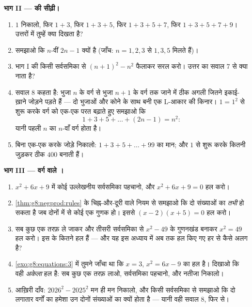 \begin{problem}[{सप्ताहांत समस्या --- $(a+b)^2$, $(a-b)^2$,
$(a+b)(a-b)$, और योग $1 + 3 + 5 + \dots + (2n-1) = n^2$}]
\medskip
\noindent\textbf{भाग II ---  की सीढ़ी।}
\begin{enumerate}[resume]
  \item $1$ निकालो, फिर $1 + 3$, फिर $1 + 3 + 5$, फिर
        $1 + 3 + 5 + 7$, फिर $1 + 3 + 5 + 7 + 9$। उत्तरों में
        तुम्हें क्या दिखता है?
  \item समझाओ कि $n$-वीं  $2n - 1$ क्यों है (जाँच:
        $n = 1, 2, 3$ से $1, 3, 5$ मिलते हैं)।
  \item भाग I की किसी सर्वसमिका से $(n + 1)^2 - n^2$ फैलाकर सरल
        करो। उत्तर का सवाल 7 से क्या नाता है?
  \item सवाल 8 कहता है: भुजा $n$ के वर्ग से भुजा $n + 1$ के वर्ग
        तक जाने में ठीक अगली  जितने इकाई-ख़ाने जोड़ने
        पड़ते हैं --- दो भुजाओं और कोने के साथ बनी एक L-आकार की
        किनार। $1 = 1^2$ से शुरू करके वर्ग को एक-एक परत बढ़ाते हुए
        समझाओ कि
        \[
        1 + 3 + 5 + \dots + (2n - 1) = n^2 :
        \]
        यानी पहली $n$  का  $n$-वाँ वर्ग होता है।
  \item बिना एक-एक करके जोड़े निकालो:
        $1 + 3 + 5 + \dots + 99$ का मान; और $1$ से शुरू करके कितनी
         जुड़कर ठीक $400$ बनाती हैं।
\end{enumerate}

\medskip
\noindent\textbf{भाग III --- वर्ग वाले ।}
\begin{enumerate}[resume]
  \item $x^2 + 6x + 9$ में कोई उल्लेखनीय सर्वसमिका पहचानो, और
         $x^2 + 6x + 9 = 0$ हल करो।
  \item \cref{thm:g8:negprod:rules} के चिह्न-और-दूरी वाले नियम से
        समझाओ कि दो संख्याओं का   \emph{तभी} हो सकता है
        जब दोनों में से कोई एक गुणक  हो। इससे
        $(x - 2)(x + 5) = 0$ हल करो।
  \item सब कुछ एक तरफ़ ले जाकर और तीसरी सर्वसमिका से $x^2 - 49$ के
        गुणनखंड बनाकर $x^2 = 49$ हल करो। इस  के कितने हल हैं
        --- और यह इस अध्याय में अब तक हल किए गए हर  से कैसे
        अलग है?
  \item \cref{exo:g8:equations:3} में तुमने जाँचा था कि $x = 3$,
        $x^2 = 6x - 9$ का हल है। दिखाओ कि वही \emph{अकेला} हल है:
        सब कुछ एक तरफ़ लाओ, सर्वसमिका पहचानो, और नतीजा निकालो।
  \item आख़िरी दाँव: $2026^2 - 2025^2$ मन ही मन निकालो, और किसी
        सर्वसमिका से समझाओ कि दो लगातार वर्गों का  हमेशा उन
        दोनों संख्याओं का  क्यों होता है --- यानी वही सवाल 8,
        फिर से।
\end{enumerate}
\end{problem}
